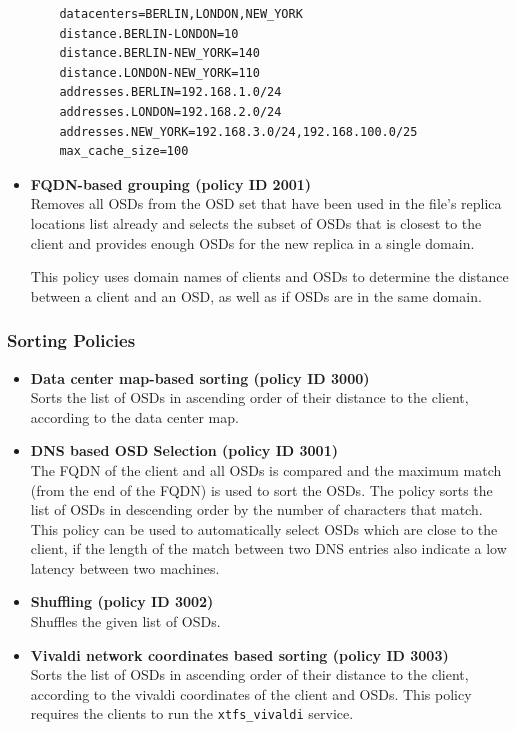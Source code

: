 \documentclass[a4paper,10pt]{book}
\begin{document}
\begin{itemize}
	\begin{verbatim}
	datacenters=BERLIN,LONDON,NEW_YORK
	distance.BERLIN-LONDON=10
	distance.BERLIN-NEW_YORK=140
	distance.LONDON-NEW_YORK=110
	addresses.BERLIN=192.168.1.0/24
	addresses.LONDON=192.168.2.0/24
	addresses.NEW_YORK=192.168.3.0/24,192.168.100.0/25
	max_cache_size=100
	\end{verbatim}

 \item \textbf{FQDN-based grouping (policy ID 2001)}\\
 Removes all OSDs from the OSD set that have been used in the file's replica locations list already and selects the subset of OSDs that is closest to the client and provides enough OSDs for the new replica in a single domain.

This policy uses domain names of clients and OSDs to determine the distance between a client and an OSD, as well as if OSDs are in the same domain.

\end{itemize}

\subsubsection{Sorting Policies}

\begin{itemize}

 \item \textbf{Data center map-based sorting (policy ID 3000)}\\
 Sorts the list of OSDs in ascending order of their distance to the client, according to the data center map.

 \item \textbf{DNS based OSD Selection (policy ID 3001)}\\
 The FQDN of the client and all OSDs is compared and the maximum match (from the end of the FQDN) is used to sort the OSDs. The policy sorts the list of OSDs in descending order by the number of characters that match. This policy can be used to automatically select OSDs which are close to the client, if the length of the match between two DNS entries also indicate a low latency between two machines.

 \item \textbf{Shuffling (policy ID 3002)}\\
 Shuffles the given list of OSDs.

 \item \textbf{Vivaldi network coordinates based sorting (policy ID 3003)}\\
 Sorts the list of OSDs in ascending order of their distance to the client, according to the vivaldi coordinates of the client and OSDs. This policy requires the clients to run the \texttt{xtfs\_vivaldi} service.

\end{itemize}
\end{document}
